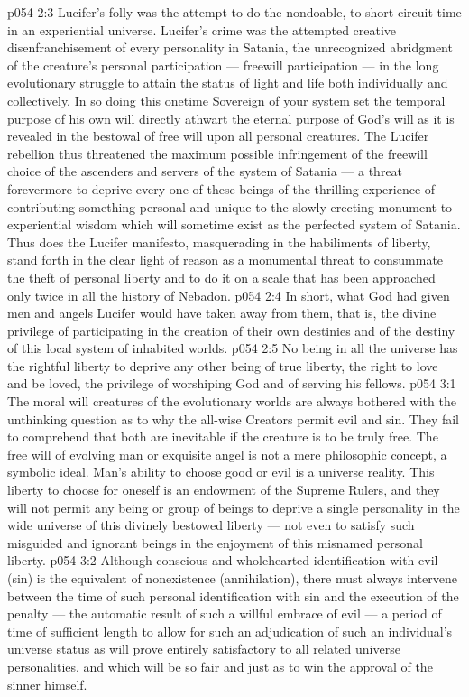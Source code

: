 \vs p054 2:3 \pc Lucifer’s folly was the attempt to do the nondoable, to short\hyp{}circuit time in an experiential universe. Lucifer’s crime was the attempted creative disenfranchisement of every personality in Satania, the unrecognized abridgment of the creature’s personal participation --- freewill participation --- in the long evolutionary struggle to attain the status of light and life both individually and collectively. In so doing this onetime Sovereign of your system set the temporal purpose of his own will directly athwart the eternal purpose of God’s will as it is revealed in the bestowal of free will upon all personal creatures. The Lucifer rebellion thus threatened the maximum possible infringement of the freewill choice of the ascenders and servers of the system of Satania --- a threat forevermore to deprive every one of these beings of the thrilling experience of contributing something personal and unique to the slowly erecting monument to experiential wisdom which will sometime exist as the perfected system of Satania. Thus does the Lucifer manifesto, masquerading in the habiliments of liberty, stand forth in the clear light of reason as a monumental threat to consummate the theft of personal liberty and to do it on a scale that has been approached only twice in all the history of Nebadon.
\vs p054 2:4 In short, what God had given men and angels Lucifer would have taken away from them, that is, the divine privilege of participating in the creation of their own destinies and of the destiny of this local system of inhabited worlds.
\vs p054 2:5 \pc No being in all the universe has the rightful liberty to deprive any other being of true liberty, the right to love and be loved, the privilege of worshiping God and of serving his fellows.
\vs p054 3:1 The moral will creatures of the evolutionary worlds are always bothered with the unthinking question as to why the all\hyp{}wise Creators permit evil and sin. They fail to comprehend that both are inevitable if the creature is to be truly free. The free will of evolving man or exquisite angel is not a mere philosophic concept, a symbolic ideal. Man’s ability to choose good or evil is a universe reality. This liberty to choose for oneself is an endowment of the Supreme Rulers, and they will not permit any being or group of beings to deprive a single personality in the wide universe of this divinely bestowed liberty --- not even to satisfy such misguided and ignorant beings in the enjoyment of this misnamed personal liberty.
\vs p054 3:2 Although conscious and wholehearted identification with evil (sin) is the equivalent of nonexistence (annihilation), there must always intervene between the time of such personal identification with sin and the execution of the penalty --- the automatic result of such a willful embrace of evil --- a period of time of sufficient length to allow for such an adjudication of such an individual’s universe status as will prove entirely satisfactory to all related universe personalities, and which will be so fair and just as to win the approval of the sinner himself.
